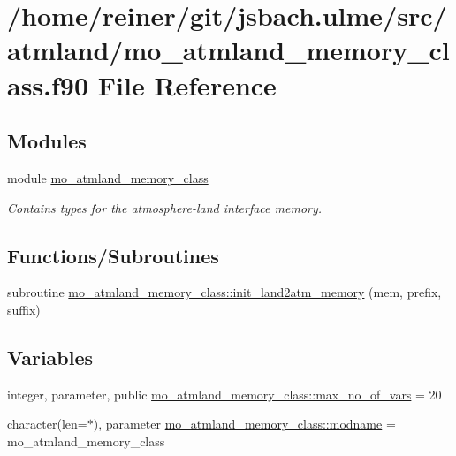\hypertarget{mo__atmland__memory__class_8f90}{}\section{/home/reiner/git/jsbach.ulme/src/atmland/mo\+\_\+atmland\+\_\+memory\+\_\+class.f90 File Reference}
\label{mo__atmland__memory__class_8f90}
\subsection*{Modules}
\begin{DoxyCompactItemize}
\item 
module \hyperlink{namespacemo__atmland__memory__class}{mo\+\_\+atmland\+\_\+memory\+\_\+class}
\begin{DoxyCompactList}\small\item\em Contains types for the atmosphere-\/land interface memory. \end{DoxyCompactList}\end{DoxyCompactItemize}
\subsection*{Functions/\+Subroutines}
\begin{DoxyCompactItemize}
\item 
subroutine \hyperlink{namespacemo__atmland__memory__class_a374d0d01cacf18ff46609c87546c67b9}{mo\+\_\+atmland\+\_\+memory\+\_\+class\+::init\+\_\+land2atm\+\_\+memory} (mem, prefix, suffix)
\end{DoxyCompactItemize}
\subsection*{Variables}
\begin{DoxyCompactItemize}
\item 
integer, parameter, public \hyperlink{namespacemo__atmland__memory__class_afae3263e73e4c64ed0955c7ac81cd609}{mo\+\_\+atmland\+\_\+memory\+\_\+class\+::max\+\_\+no\+\_\+of\+\_\+vars} = 20
\item 
character(len=$\ast$), parameter \hyperlink{namespacemo__atmland__memory__class_a61803b8c6f643016537157a3763a73c6}{mo\+\_\+atmland\+\_\+memory\+\_\+class\+::modname} = \textquotesingle{}mo\+\_\+atmland\+\_\+memory\+\_\+class\textquotesingle{}
\end{DoxyCompactItemize}
